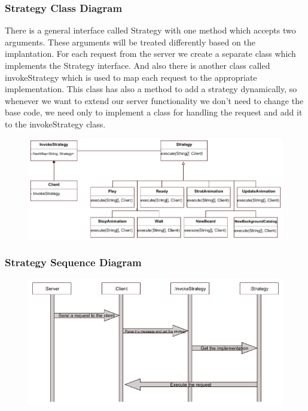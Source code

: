 \documentclass{article}
\begin{document}
\subsubsection{Strategy Class Diagram}
There is a general interface called Strategy with one method which accepts two arguments. These arguments will be treated differently based on the implantation. For each request from the server we create a separate class which implements the Strategy interface. And also there is another class called invokeStrategy which is used to map each request to the appropriate implementation. This class has also a method to add a strategy dynamically, so whenever we want to extend our server functionality we don't need to change the base code, we need only to implement a class for handling the request and add it to the invokeStrategy class.


\begin{figure}[H]
\includegraphics[scale=0.90]{Images/StrategyClassDiagram.png}
\end{figure}

\subsubsection{Strategy Sequence Diagram} 
\begin{figure}[H]
\includegraphics[scale=0.90]{Images/StrategySequenceDiagram.png}
\end{figure}
\end{document}
